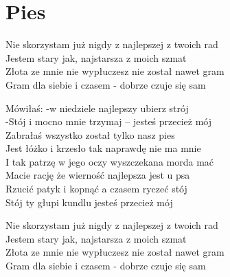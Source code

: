 \section{Pies}
\begin{text}
Nie skorzystam już nigdy z najlepszej z twoich rad\\
Jestem stary jak, najstarsza z moich szmat\\
Złota ze mnie nie wypłuczesz nie został nawet gram\\
Gram dla siebie i czasem - dobrze czuje się sam

Mówiłaś: -w niedziele najlepszy ubierz strój\\
-Stój i mocno mnie trzymaj – jesteś przecież mój\\
Zabrałaś wszystko został tylko nasz pies\\
Jest łóżko i krzesło tak naprawdę nie ma mnie\\

I tak patrzę w jego oczy wyszczekana morda mać\\
Macie rację że wierność najlepsza jest u psa\\
Rzucić patyk i kopnąć a czasem ryczeć stój\\
Stój ty głupi kundlu jesteś przecież mój

Nie skorzystam już nigdy z najlepszej z twoich rad\\
Jestem stary jak, najstarsza z moich szmat\\
Złota ze mnie nie wypłuczesz nie został nawet gram\\
Gram dla siebie i czasem - dobrze czuje się sam
\end{text}